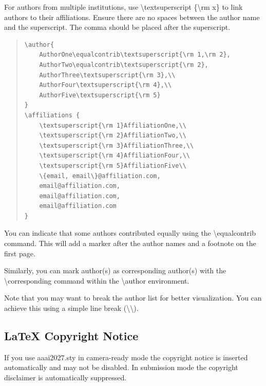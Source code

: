 \noindent For authors from multiple institutions, use \textbackslash textsuperscript \{\textbackslash rm x\} to link authors to their affiliations. Ensure there are no spaces between the author name and the superscript. The comma should be placed after the superscript.

\begin{quote}\begin{scriptsize}\begin{verbatim}
\author{
    AuthorOne\equalcontrib\textsuperscript{\rm 1,\rm 2},
    AuthorTwo\equalcontrib\textsuperscript{\rm 2},
    AuthorThree\textsuperscript{\rm 3},\\
    AuthorFour\textsuperscript{\rm 4},\\
    AuthorFive\textsuperscript{\rm 5}
}
\affiliations {
    \textsuperscript{\rm 1}AffiliationOne,\\
    \textsuperscript{\rm 2}AffiliationTwo,\\
    \textsuperscript{\rm 3}AffiliationThree,\\
    \textsuperscript{\rm 4}AffiliationFour,\\
    \textsuperscript{\rm 5}AffiliationFive\\
    \{email, email\}@affiliation.com,
    email@affiliation.com,
    email@affiliation.com,
    email@affiliation.com
}
\end{verbatim}\end{scriptsize}\end{quote}

You can indicate that some authors contributed equally using the \textbackslash equalcontrib command. This will add a marker after the author names and a footnote on the first page.

Similarly, you can mark author(s) as corresponding author(s) with the \textbackslash corresponding command within the \textbackslash author environment.

Note that you may want to  break the author list for better visualization. You can achieve this using a simple line break (\textbackslash  \textbackslash).

\subsection{\LaTeX{} Copyright Notice}
If you use aaai2027.sty in camera-ready mode the copyright notice is inserted automatically and may not be disabled. In submission mode the copyright disclaimer is automatically suppressed.

